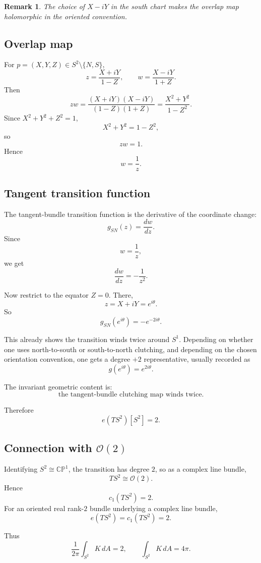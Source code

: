 \documentclass[11pt]{article}
\newtheorem{remark}{Remark}
\begin{document}
	\begin{remark}
		The choice of \(X-iY\) in the south chart makes the overlap map holomorphic in the oriented convention.
	\end{remark}
	
	\subsection{Overlap map}
	
	For \(p=(X,Y,Z)\in S^2\setminus\{N,S\}\),
	\[
	z=\frac{X+iY}{1-Z},
	\qquad
	w=\frac{X-iY}{1+Z}.
	\]
	Then
	\[
	zw
	=
	\frac{(X+iY)(X-iY)}{(1-Z)(1+Z)}
	=
	\frac{X^2+Y^2}{1-Z^2}.
	\]
	Since \(X^2+Y^2+Z^2=1\),
	\[
	X^2+Y^2=1-Z^2,
	\]
	so
	\[
	zw=1.
	\]
	Hence
	\[
	w=\frac{1}{z}.
	\]
	
	\subsection{Tangent transition function}
	
	The tangent-bundle transition function is the derivative of the coordinate change:
	\[
	g_{SN}(z)=\frac{dw}{dz}.
	\]
	Since
	\[
	w=\frac{1}{z},
	\]
	we get
	\[
	\frac{dw}{dz}=-\frac{1}{z^2}.
	\]
	
	Now restrict to the equator \(Z=0\). There,
	\[
	z=X+iY=e^{i\theta}.
	\]
	So
	\[
	g_{SN}(e^{i\theta})=-e^{-2i\theta}.
	\]
	
	This already shows the transition winds twice around \(S^1\). Depending on whether one uses north-to-south or south-to-north clutching, and depending on the chosen orientation convention, one gets a degree \(+2\) representative, usually recorded as
	\[
	g(e^{i\theta})=e^{2i\theta}.
	\]
	
	The invariant geometric content is:
	\[
	\boxed{\text{the tangent-bundle clutching map winds twice.}}
	\]
	
	Therefore
	\[
	e(TS^2)[S^2]=2.
	\]
	
	\subsection{Connection with \(\mathcal O(2)\)}
	
	Identifying \(S^2\cong\mathbb{CP}^1\), the transition has degree \(2\), so as a complex line bundle,
	\[
	TS^2\cong \mathcal O(2).
	\]
	Hence
	\[
	c_1(TS^2)=2.
	\]
	For an oriented real rank-\(2\) bundle underlying a complex line bundle,
	\[
	e(TS^2)=c_1(TS^2)=2.
	\]
	
	Thus
	\[
	\frac{1}{2\pi}\int_{S^2}K\,dA=2,
	\qquad
	\int_{S^2}K\,dA=4\pi.
	\]
	
\end{document}

